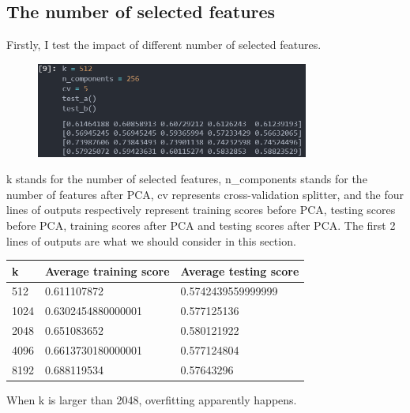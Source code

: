 \documentclass[UTF8, a4paper, 11pt]{article}
\begin{document}
\subsection{The number of selected features}
Firstly, I test the impact of different number of selected features.
\begin{figure}[H]
    \centering
    \includegraphics[width=0.8\textwidth]{k.png}
\end{figure}
k stands for the number of selected features, n\_components stands for the number of features after PCA, cv represents cross-validation splitter, and the four lines of outputs respectively represent training scores before PCA, testing scores before PCA, training scores after PCA and testing scores after PCA.
The first 2 lines of outputs are what we should consider in this section.
\begin{table}[H]
    \center
\begin{tabular}{|l|l|l|}
\hline
k    & Average training score & Average testing score \\ \hline
512  & 0.611107872            & 0.5742439559999999    \\ \hline
1024 & 0.6302454880000001     & 0.577125136           \\ \hline
2048 & 0.651083652            & 0.580121922           \\ \hline
4096 & 0.6613730180000001     & 0.577124804           \\ \hline
8192 & 0.688119534            & 0.57643296            \\ \hline
\end{tabular}
\end{table}
When k is larger than 2048, overfitting apparently happens.
\end{document}
